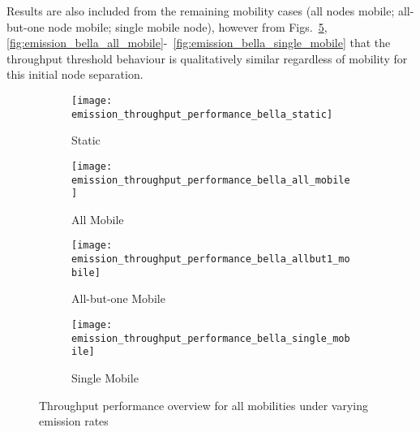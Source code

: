Results are also included from the remaining mobility cases (all nodes mobile; all-but-one node mobile; single mobile node), however from Figs.~\ref{fig:emission_all},~ \ref{fig:emission_bella_all_mobile}-~\ref{fig:emission_bella_single_mobile} that the throughput threshold behaviour is qualitatively similar regardless of mobility for this initial node separation.



\begin{figure}[h]
	\begin{subfigure}[t]{0.5\textwidth}
		\centering
		\texttt{[image: emission\_throughput\_performance\_bella\_static]}
		\caption{Static}
		\label{fig:emission_throughput_performance_sum_bella_static}
	\end{subfigure}
	\begin{subfigure}[t]{0.5\textwidth}
		\centering
		\texttt{[image: emission\_throughput\_performance\_bella\_all\_mobile]}
		\caption{All Mobile}
		\label{fig:emission_throughput_performance_sum_bella_all_mobile}
	\end{subfigure}  
	
	\begin{subfigure}[t]{0.5\textwidth}
		\centering
		\texttt{[image: emission\_throughput\_performance\_bella\_allbut1\_mobile]}
		\caption{All-but-one Mobile}
		\label{fig:emission_throughput_performance_sum_bella_allbut1_mobile}
	\end{subfigure}  
	\begin{subfigure}[t]{0.5\textwidth}
		\centering
		\texttt{[image: emission\_throughput\_performance\_bella\_single\_mobile]}
		\caption{Single Mobile}
		\label{fig:emission_throughput_performance_sum_bella_single_mobile}
	\end{subfigure}
	\caption{Throughput performance overview for all mobilities under varying emission rates}
	\label{fig:emission_all}
\end{figure}


